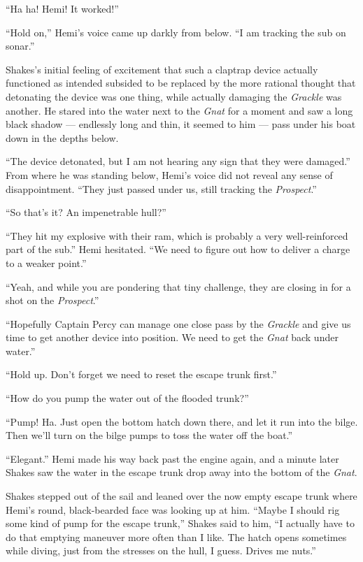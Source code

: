 \documentclass[
]{scrbook}
\begin{document}
``Ha ha! Hemi! It worked!''

``Hold on,'' Hemi's voice came up darkly from below. ``I am tracking the
sub on sonar.''

Shakes's initial feeling of excitement that such a claptrap device
actually functioned as intended subsided to be replaced by the more
rational thought that detonating the device was one thing, while
actually damaging the \emph{Grackle} was another. He stared into the
water next to the \emph{Gnat} for a moment and saw a long black shadow
--- endlessly long and thin, it seemed to him --- pass under his boat
down in the depths below.

``The device detonated, but I am not hearing any sign that they were
damaged.'' From where he was standing below, Hemi's voice did not reveal
any sense of disappointment. ``They just passed under us, still tracking
the \emph{Prospect}.''

``So that's it? An impenetrable hull?''

``They hit my explosive with their ram, which is probably a very
well-reinforced part of the sub.'' Hemi hesitated. ``We need to figure
out how to deliver a charge to a weaker point.''

``Yeah, and while you are pondering that tiny challenge, they are
closing in for a shot on the \emph{Prospect}.''

``Hopefully Captain Percy can manage one close pass by the
\emph{Grackle} and give us time to get another device into position. We
need to get the \emph{Gnat} back under water.''

``Hold up. Don't forget we need to reset the escape trunk first.''

``How do you pump the water out of the flooded trunk?''

``Pump! Ha. Just open the bottom hatch down there, and let it run into
the bilge. Then we'll turn on the bilge pumps to toss the water off the
boat.''

``Elegant.'' Hemi made his way back past the engine again, and a minute
later Shakes saw the water in the escape trunk drop away into the bottom
of the \emph{Gnat}.

Shakes stepped out of the sail and leaned over the now empty escape
trunk where Hemi's round, black-bearded face was looking up at him.
``Maybe I should rig some kind of pump for the escape trunk,'' Shakes
said to him, ``I actually have to do that emptying maneuver more often
than I like. The hatch opens sometimes while diving, just from the
stresses on the hull, I guess. Drives me nuts.''
\end{document}
